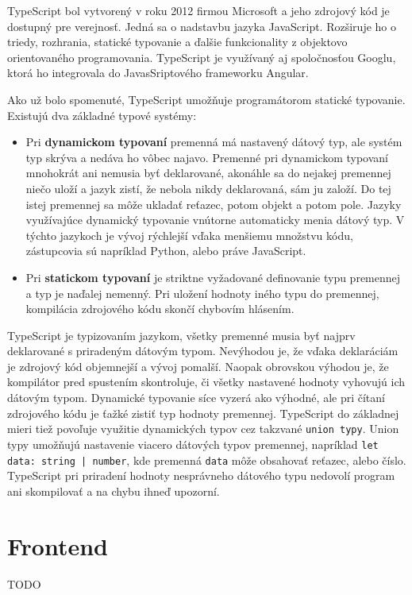TypeScript\cite{typescript} bol vytvorený v roku 2012 firmou Microsoft a jeho zdrojový kód je dostupný pre verejnosť. Jedná sa o nadstavbu jazyka JavaScript. Rozširuje ho o triedy, rozhrania, statické typovanie a ďalšie funkcionality z objektovo orientovaného programovania. TypeScript je využívaný aj spoločnosťou Googlu, ktorá ho integrovala do JavasSriptového frameworku Angular.

Ako už bolo spomenuté, TypeScript umožňuje programátorom statické typovanie. Existujú dva základné typové systémy:
    \begin{itemize}
        \item Pri \textbf{dynamickom typovaní} premenná má nastavený dátový typ, ale systém typ skrýva a nedáva ho vôbec najavo. Premenné pri dynamickom typovaní mnohokrát ani nemusia byť deklarované, akonáhle sa do nejakej premennej niečo uloží a jazyk zistí, že nebola nikdy deklarovaná, sám ju založí. Do tej istej premennej sa môže ukladať reťazec, potom objekt a potom pole. Jazyky využívajúce dynamický typovanie vnútorne automaticky menia dátový typ. V týchto jazykoch je vývoj rýchlejší vďaka menšiemu množstvu kódu, zástupcovia sú napríklad Python, alebo práve JavaScript.
        \item Pri \textbf{statickom typovaní} je striktne vyžadované definovanie typu premennej a typ je naďalej nemenný. Pri uložení hodnoty iného typu do premennej, kompilácia zdrojového kódu skončí chybovím hlásením.
    \end{itemize}
    
    TypeScript\cite{typescript} je typizovaním jazykom, všetky premenné musia byť najprv deklarované s priradeným dátovým typom. Nevýhodou je, že vďaka deklaráciám je zdrojový kód objemnejší a vývoj pomalší. Naopak obrovskou výhodou je, že kompilátor pred spustením skontroluje, či všetky nastavené hodnoty vyhovujú ich dátovým typom. Dynamické typovanie síce vyzerá ako výhodné, ale pri čítaní zdrojového kódu je ťažké zistiť typ hodnoty premennej. TypeScript do základnej mieri tiež povoľuje využitie dynamických typov cez takzvané \texttt{union typy}. Union typy umožňujú nastavenie viacero dátových typov premennej, napríklad \texttt{let data: string | number}, kde premenná \texttt{data} môže obsahovať reťazec, alebo číslo. TypeScript pri priradení hodnoty nesprávneho dátového typu nedovolí program ani skompilovať a na chybu ihneď upozorní.
\section{Frontend}
TODO

